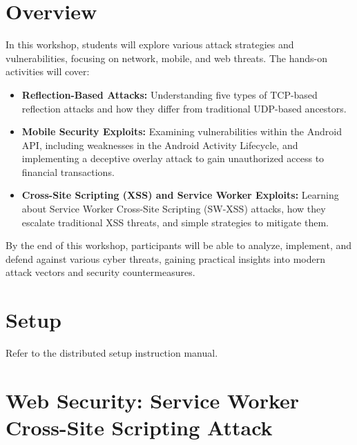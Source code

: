 \documentclass[letterpaper,12pt]{report}
\newcounter{taskset}
\newcounter{action}[taskset]
\begin{document}
\clearpage
{}
\settableofcontents
\tableofcontents
\clearpage

\newpage

\section*{Overview}\label{sec:work-carried-out-2}

In this workshop, students will explore various attack strategies and vulnerabilities, focusing on network, mobile, and web threats. The hands-on activities will cover:

\begin{itemize}
    \item \textbf{Reflection-Based Attacks:} Understanding five types of TCP-based reflection attacks and how they differ from traditional UDP-based ancestors.
    \item \textbf{Mobile Security Exploits:} Examining vulnerabilities within the Android API, including weaknesses in the Android Activity Lifecycle, and implementing a deceptive overlay attack to gain unauthorized access to financial transactions.
    \item \textbf{Cross-Site Scripting (XSS) and Service Worker Exploits:} Learning about Service Worker Cross-Site Scripting (SW-XSS) attacks, how they escalate traditional XSS threats, and simple strategies to mitigate them.
\end{itemize}

By the end of this workshop, participants will be able to analyze, implement, and defend against various cyber threats, gaining practical insights into modern attack vectors and security countermeasures.


\section*{Setup}\label{sec:Setup}

Refer to the distributed setup instruction manual.

\section*{Web Security: Service Worker Cross-Site Scripting Attack}
\end{document}
